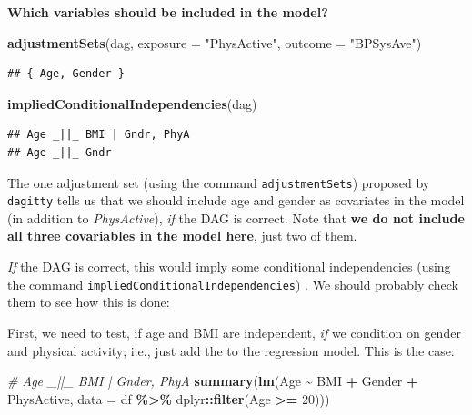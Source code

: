 \documentclass[
]{book}
\newenvironment{Shaded}{\begin{snugshade}}{\end{snugshade}}
\newcommand{\AttributeTok}[1]{\textcolor[rgb]{0.13,0.29,0.53}{#1}}
\newcommand{\CommentTok}[1]{\textcolor[rgb]{0.56,0.35,0.01}{\textit{#1}}}
\newcommand{\DecValTok}[1]{\textcolor[rgb]{0.00,0.00,0.81}{#1}}
\newcommand{\FunctionTok}[1]{\textcolor[rgb]{0.13,0.29,0.53}{\textbf{#1}}}
\newcommand{\NormalTok}[1]{#1}
\newcommand{\SpecialCharTok}[1]{\textcolor[rgb]{0.81,0.36,0.00}{\textbf{#1}}}
\newcommand{\StringTok}[1]{\textcolor[rgb]{0.31,0.60,0.02}{#1}}
\begin{document}
\textbf{Which variables should be included in the model?}

\begin{Shaded}
\begin{Highlighting}[]
\FunctionTok{adjustmentSets}\NormalTok{(dag, }\AttributeTok{exposure =} \StringTok{"PhysActive"}\NormalTok{, }\AttributeTok{outcome =} \StringTok{"BPSysAve"}\NormalTok{)}
\end{Highlighting}
\end{Shaded}

\begin{verbatim}
## { Age, Gender }
\end{verbatim}

\begin{Shaded}
\begin{Highlighting}[]
\FunctionTok{impliedConditionalIndependencies}\NormalTok{(dag)}
\end{Highlighting}
\end{Shaded}

\begin{verbatim}
## Age _||_ BMI | Gndr, PhyA
## Age _||_ Gndr
\end{verbatim}

The one adjustment set (using the command \texttt{adjustmentSets}) proposed by \texttt{dagitty} tells us that
we should include age and gender as covariates in the model (in addition to \emph{PhysActive}),
\emph{if} the DAG is correct.
Note that \textbf{we do not include all three covariables in the model here}, just two of them.

\emph{If} the DAG is correct, this would imply some conditional independencies
(using the command \texttt{impliedConditionalIndependencies}) .
We should probably check them to see how this is done:

First, we need to test, if age and BMI are independent,
\emph{if} we condition on gender and physical activity;
i.e., just add the to the regression model.
This is the case:

\begin{Shaded}
\begin{Highlighting}[]
\CommentTok{\# Age \_||\_ BMI | Gnder, PhyA}
\FunctionTok{summary}\NormalTok{(}\FunctionTok{lm}\NormalTok{(Age }\SpecialCharTok{\textasciitilde{}}\NormalTok{ BMI }\SpecialCharTok{+}\NormalTok{ Gender }\SpecialCharTok{+}\NormalTok{ PhysActive, }\AttributeTok{data =}\NormalTok{ df }\SpecialCharTok{\%\textgreater{}\%}\NormalTok{ dplyr}\SpecialCharTok{::}\FunctionTok{filter}\NormalTok{(Age }\SpecialCharTok{\textgreater{}=} \DecValTok{20}\NormalTok{)))}
\end{Highlighting}
\end{Shaded}
\end{document}
